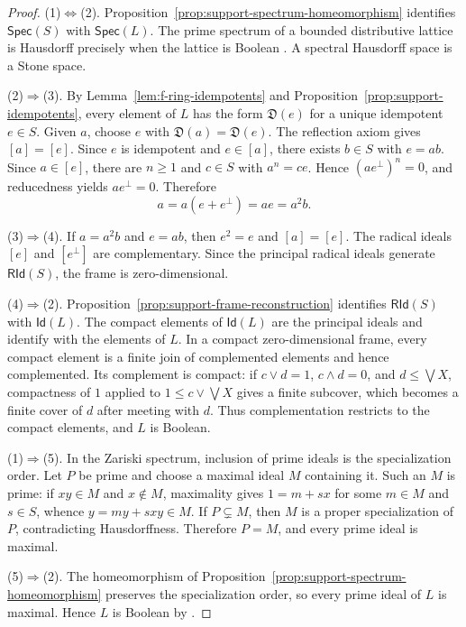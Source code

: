 \documentclass[12pt,leqno]{amsart}
\newcommand{\Spec}{\mathsf{Spec}}
\newcommand{\RId}{\mathsf{RId}}
\newcommand{\Id}{\mathsf{Id}}
\theoremstyle{definition}
\numberwithin{equation}{section}
\theoremstyle{remark}
\def\leq{\leqslant}
\begin{document}
\begin{proof}
(1)$\Leftrightarrow$(2). Proposition~\ref{prop:support-spectrum-homeomorphism} identifies \(\Spec(S)\) with \(\Spec(L)\). The prime spectrum of a bounded distributive lattice is Hausdorff precisely when the lattice is Boolean \cite[Chapter~II, Proposition~4.4]{Johnstone}. A spectral Hausdorff space is a Stone space.

(2)$\Rightarrow$(3). By Lemma~\ref{lem:f-ring-idempotents} and Proposition~\ref{prop:support-idempotents}, every element of $L$ has the form \(\mathfrak D(e)\) for a unique idempotent \(e\in S\). Given $a$, choose $e$ with \(\mathfrak D(a)=\mathfrak D(e)\). The reflection axiom gives \([a]=[e]\). Since $e$ is idempotent and \(e\in[a]\), there exists \(b\in S\) with \(e=ab\). Since \(a\in[e]\), there are \(n\geq1\) and \(c\in S\) with \(a^n=ce\). Hence
\((ae^\perp)^n=0\), and reducedness yields \(ae^\perp=0\). Therefore
\[
a=a(e+e^\perp)=ae=a^2b.
\]

(3)$\Rightarrow$(4). If \(a=a^2b\) and \(e=ab\), then \(e^2=e\) and \([a]=[e]\). The radical ideals \([e]\) and \([e^\perp]\) are complementary. Since the principal radical ideals generate \(\RId(S)\), the frame is zero-dimensional.

(4)$\Rightarrow$(2). Proposition~\ref{prop:support-frame-reconstruction} identifies \(\RId(S)\) with \(\Id(L)\). The compact elements of \(\Id(L)\) are the principal ideals and identify with the elements of $L$. In a compact zero-dimensional frame, every compact element is a finite join of complemented elements and hence complemented. Its complement is compact: if \(c\vee d=1\), \(c\wedge d=0\), and \(d\leq\bigvee X\), compactness of $1$ applied to \(1\leq c\vee\bigvee X\) gives a finite subcover, which becomes a finite cover of $d$ after meeting with $d$. Thus complementation restricts to the compact elements, and $L$ is Boolean.

(1)$\Rightarrow$(5). In the Zariski spectrum, inclusion of prime ideals is the specialization order. Let $P$ be prime and choose a maximal ideal $M$ containing it. Such an $M$ is prime: if \(xy\in M\) and \(x\notin M\), maximality gives \(1=m+sx\) for some \(m\in M\) and \(s\in S\), whence \(y=my+sxy\in M\). If \(P\subsetneq M\), then $M$ is a proper specialization of $P$, contradicting Hausdorffness. Therefore \(P=M\), and every prime ideal is maximal.

(5)$\Rightarrow$(2). The homeomorphism of Proposition~\ref{prop:support-spectrum-homeomorphism} preserves the specialization order, so every prime ideal of $L$ is maximal. Hence $L$ is Boolean by \cite[Chapter~II, Corollary~4.9]{Johnstone}.
\end{proof}
\end{document}
